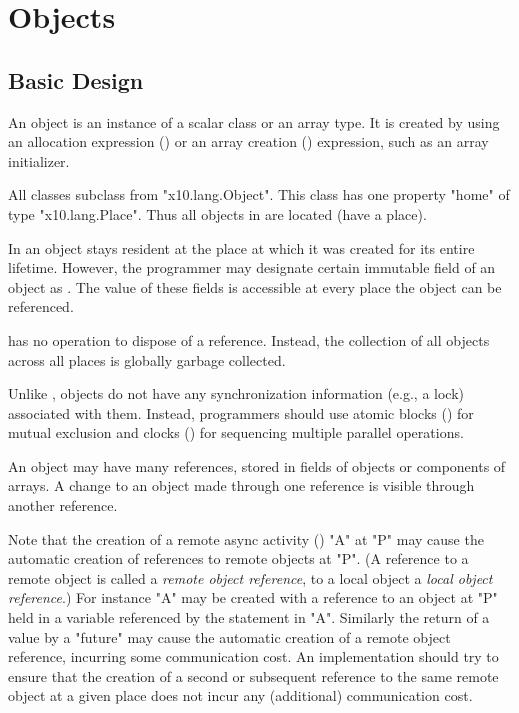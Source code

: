 \chapter{Objects}\label{XtenObjects}

\section{Basic Design}
An object is an instance of a scalar class or an array type.  It is
created by using an allocation expression
() or an array creation
() expression, such as an array
initializer. 

All classes subclass from \xcd"x10.lang.Object".
This class has one property \xcd"home" of type
\xcd"x10.lang.Place".  Thus all objects in \Xten{}
are located (have a place). 

In \XtenCurrVer{} an object stays resident at the place at
which it was created for its entire lifetime. However, the
programmer may designate certain immutable field of an object
as . The value of these fields is accessible at every place the object can be referenced.

{}\Xten{} has no operation to dispose of a reference.  Instead, the
collection of all objects across all places is globally garbage
collected.

Unlike \java{},
{}\Xten{} objects do not have any synchronization information (e.g.,
a lock) associated with them. 
Instead, programmers should use atomic blocks
() for mutual exclusion and clocks
() for sequencing multiple parallel operations.

An object may have many references, stored in fields of
objects or components of arrays. A change to an object made through
one reference is visible through another reference. 

Note that the creation of a remote async activity
() \xcd"A" at \xcd"P" may cause the automatic creation of
references to remote objects at \xcd"P". (A reference to a remote
object is called a {\em remote object reference}, to a local object a
{\em local object reference}.)  For instance \xcd"A" may be created
with a reference to an object at \xcd"P" held in a variable referenced
by the statement in \xcd"A".  Similarly the return of a value by a
\xcd"future" may cause the automatic creation of a remote object
reference, incurring some communication cost.  An {}\Xten{}
implementation should try to ensure that the creation of a second or
subsequent reference to the same remote object at a given place does
not incur any (additional) communication cost.

